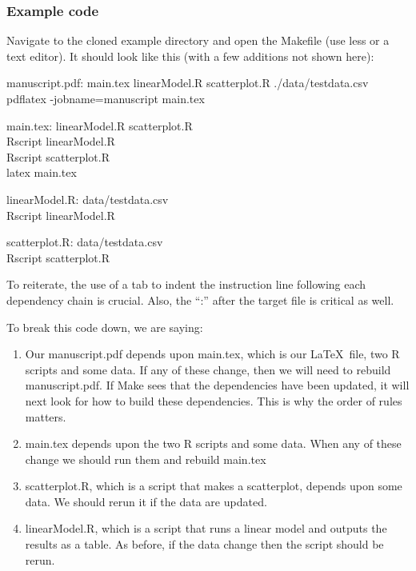 \documentclass{article}
\begin{document}
\subsubsection{Example code}

Navigate to the cloned example directory and open the Makefile (use {\sf less} or a text editor). It should look like this (with a few additions not shown here): 
\newcommand\tab[1][1cm]{\hspace*{#1}}

\noindent manuscript.pdf: main.tex linearModel.R scatterplot.R ./data/testdata.csv\\
\tab pdflatex -jobname=manuscript main.tex

\noindent main.tex: linearModel.R scatterplot.R\\
\tab Rscript linearModel.R\\
\tab Rscript scatterplot.R\\
\tab latex main.tex 

\noindent linearModel.R: data/testdata.csv\\
\tab Rscript linearModel.R

\noindent scatterplot.R: data/testdata.csv\\
\tab Rscript scatterplot.R

To reiterate, the use of a tab to indent the instruction line following each dependency chain is crucial. Also, the ``:'' after the target file is critical as well.

\noindent To break this code down, we are saying:

\begin{enumerate}
\item Our manuscript.pdf depends upon main.tex, which is our \LaTeX\ file, two R scripts and some data. If any of these change, then we will need to rebuild manuscript.pdf. If {\sf Make} sees that the dependencies have been updated, it will next look for how to build these dependencies. This is why the order of rules matters.
\item main.tex depends upon the two R scripts and some data. When any of these change we should run them and rebuild main.tex
\item scatterplot.R, which is a script that makes a scatterplot, depends upon some data. We should rerun it if the data are updated.
\item linearModel.R, which is a script that runs a linear model and outputs the results as a table. As before, if the data change then the script should be rerun.
\end{enumerate}
\end{document}
